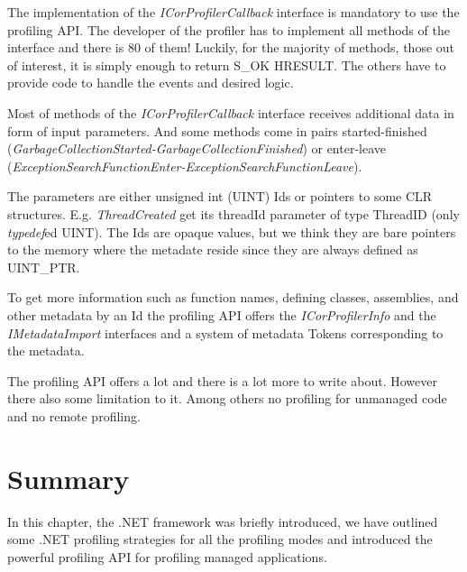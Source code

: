 The implementation of the \textit{ICorProfilerCallback} interface is mandatory to use the profiling API. The developer of the profiler has to implement all methods of the interface and there is 80 of them! Luckily, for the majority of methods, those out of interest, it is simply enough to return S\_OK HRESULT. The others have to provide code to handle the events and desired logic.

Most of methods of the \textit{ICorProfilerCallback} interface receives additional data in form of input parameters. And some methods come in pairs started-finished (\textit{GarbageCollectionStarted-GarbageCollectionFinished}) or enter-leave (\textit{ExceptionSearchFunctionEnter-ExceptionSearchFunctionLeave}). 

The parameters are either unsigned int (UINT) Ids or pointers to some CLR structures. E.g. \textit{ThreadCreated} get its threadId parameter of type ThreadID (only \textit{typedef}ed UINT). The Ids are opaque values, but we think they are bare pointers to the memory where the metadate reside since they are always defined as UINT\_PTR.

To get more information such as function names, defining classes, assemblies, and other metadata by an Id the profiling API offers the \textit{ICorProfilerInfo} and the \textit{IMetadataImport} interfaces and a system of metadata Tokens corresponding to the metadata.

The profiling API offers a lot and there is a lot more to write about. However there also some limitation to it. Among others no profiling for unmanaged code and no remote profiling. 

\section{Summary}
In this chapter, the .NET framework was briefly introduced, we have outlined some .NET profiling strategies for all the profiling modes and introduced the powerful profiling API for profiling managed applications.
